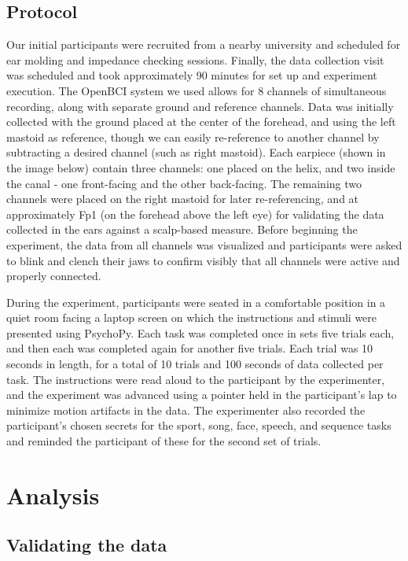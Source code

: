 \documentclass[letterpaper,twocolumn,10pt]{article}
\begin{document}
\subsection{Protocol}
\label{sec:org2041857}
Our initial participants were recruited from a nearby university and scheduled for ear molding
and impedance checking sessions. Finally, the data collection visit was scheduled and took
approximately 90 minutes for set up and experiment execution. The OpenBCI system we used
allows for 8 channels of simultaneous recording, along with separate ground and reference channels.
Data was initially collected with the ground placed at the center of the forehead, and using the left
mastoid as reference, though we can easily re-reference to another channel by subtracting a desired
channel (such as right mastoid). Each earpiece (shown in the image below) contain three channels: 
one placed on the helix, and two inside the canal - one front-facing and the other back-facing. The remaining
two channels were placed on the right mastoid for later re-referencing, and at approximately Fp1 (on the 
forehead above the left eye) for validating the data collected in the ears against a scalp-based measure. 
Before beginning the experiment, the data from all channels was visualized and participants were asked to
blink and clench their jaws to confirm visibly that all channels were active and properly connected.

During the experiment, participants were seated in a comfortable position in a quiet room facing a laptop screen on which the
instructions and stimuli were presented using PsychoPy. Each task was completed once in sets five trials each, and then
each was completed again for another five trials. Each trial was 10 seconds in length, for a total of 10 trials and 
100 seconds of data collected per task. The instructions were read aloud to the participant by the experimenter, and
the experiment was advanced using a pointer held in the participant's lap to minimize motion artifacts in the data.  
The experimenter also recorded the participant's chosen secrets for the sport, song, face, speech, and sequence
 tasks and reminded the participant of these for the second set of trials.
\section{Analysis}
\label{sec:org6c1a839}
\subsection{Validating the data}
\label{sec:org800f2bd}
\end{document}
